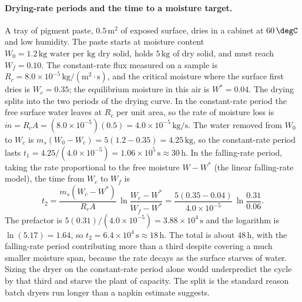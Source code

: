 \paragraph{Drying-rate periods and the time to a moisture target.} A
tray of pigment paste, $0.5\,\text{m}^2$ of exposed surface, dries in a
cabinet at $60\,\degC$ and low humidity. The paste starts at moisture
content $W_0 = 1.2\,\text{kg water per kg dry solid}$, holds
$5\,\text{kg}$ of dry solid, and must reach $W_f = 0.10$. The
constant-rate flux measured on a sample is $R_c = 8.0\times 10^{-5}\,
\text{kg}/(\text{m}^2\cdot\text{s})$, and the critical moisture where
the surface first dries is $W_c = 0.35$; the equilibrium moisture in
this air is $W^{*} = 0.04$. The drying splits into the two periods of
the drying curve. In the constant-rate period the free surface water
leaves at $R_c$ per unit area, so the rate of moisture loss is
$\dot m = R_c A = (8.0\times 10^{-5})(0.5) = 4.0\times 10^{-5}\,\text{kg/s}$.
The water removed from $W_0$ to $W_c$ is $m_s(W_0 - W_c) = 5(1.2-0.35) =
4.25\,\text{kg}$, so the constant-rate period lasts
$t_1 = 4.25/(4.0\times 10^{-5}) = 1.06\times 10^{5}\,\text{s} \approx
30\,\text{h}$. In the falling-rate period, taking the rate proportional
to the free moisture $W-W^{*}$ (the linear falling-rate model), the time
from $W_c$ to $W_f$ is
\[
t_2 = \frac{m_s (W_c - W^{*})}{R_c A}\,\ln\!\frac{W_c - W^{*}}{W_f - W^{*}}
= \frac{5(0.35-0.04)}{4.0\times 10^{-5}}\,\ln\!\frac{0.31}{0.06}.
\]
The prefactor is $5(0.31)/(4.0\times 10^{-5}) = 3.88\times 10^{4}\,
\text{s}$ and the logarithm is $\ln(5.17) = 1.64$, so $t_2 = 6.4\times
10^{4}\,\text{s} \approx 18\,\text{h}$. The total is about $48\,\text{h}$,
with the falling-rate period contributing more than a third despite
covering a much smaller moisture span, because the rate decays as the
surface starves of water. Sizing the dryer on the constant-rate period
alone would underpredict the cycle by that third and starve the plant of
capacity. The split is the standard reason batch dryers run longer than a
napkin estimate suggests.

